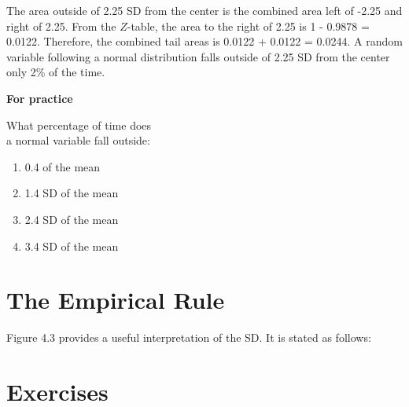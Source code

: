 \documentclass[11pt, chapterprefix=true]{scrbook}\usepackage[]{graphicx}\usepackage[]{color}
\begin{document}
The area outside of 2.25 SD from the center is the combined area left of -2.25 and right of 2.25.  From the $Z$-table, the area to the right of 2.25 is 1 - 0.9878 = 0.0122.  Therefore, the combined tail areas is 0.0122 + 0.0122 = 0.0244.  A random variable following a normal distribution falls outside of 2.25 SD from the center only 2\% of the time.

\begin{minipage}[ht]{3cm}

\textbf{For practice}
\end{minipage}
\begin{minipage}[ht]{6cm}

\parbox{6cm}{
  What percentage of time does \\ a normal variable fall outside:

  \begin{enumerate}
  \item 0.4 of the mean
  \item 1.4 SD of the mean
  \item 2.4 SD of the mean
  \item 3.4 SD of the mean
  \end{enumerate}
}
\end{minipage}

\section{The Empirical Rule}

Figure 4.3 provides a useful interpretation of the SD.  It is stated as follows:



\twocolumn

\section{Exercises}
\end{document}
